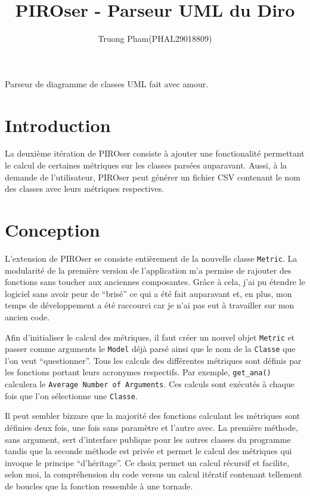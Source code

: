 \documentclass[12pt]{article}
\title{PIROser - Parseur UML du Diro}
\author{Truong Pham(PHAL29018809)}
\begin{document}
\maketitle

\abstract
Parseur de diagramme de classes UML fait avec amour.

\section{Introduction}

La deuxième itération de PIROser consiste à ajouter une fonctionalité permettant le calcul de certaines métriques sur les classes parsées auparavant. Aussi, à la demande de l'utilisateur, PIROser peut générer un fichier CSV contenant le nom des classes avec leurs métriques respectives.

\section{Conception}

L'extension de PIROser se consiste entièrement de la nouvelle classe \texttt{Metric}. La modularité de la première version de l'application m'a permise de rajouter des fonctions sans toucher aux anciennes composantes. Grâce à cela, j'ai pu étendre le logiciel sans avoir peur de ``brisé'' ce qui a été fait auparavant et, en plus, mon temps de développement a été raccourci car je n'ai pas eut à travailler sur mon ancien code.

Afin d'initialiser le calcul des métriques, il faut créer un nouvel objet \texttt{Metric} et passer comme arguments le \texttt{Model} déjà parsé ainsi que le nom de la \texttt{Classe} que l'on veut ``questionner''. Tous les calculs des différentes métriques sont définis par les fonctions portant leurs acronymes respectifs. Par exemple, \texttt{get\_ana()} calculera le \texttt{Average Number of Arguments}. Ces calculs sont exécutés à chaque fois que l'on sélectionne une \texttt{Classe}.

Il peut sembler bizzare que la majorité des fonctions calculant les métriques sont définies deux fois, une fois sans paramètre et l'autre avec. La première méthode, sans argument, sert d'interface publique pour les autres classes du programme tandis que la seconde méthode est privée et permet le calcul des métriques qui invoque le principe ``d'héritage''. Ce choix permet un calcul récursif et facilite, selon moi, la compréhension du code versus un calcul itératif contenant tellement de boucles que la fonction ressemble à une tornade. 
\end{document}
